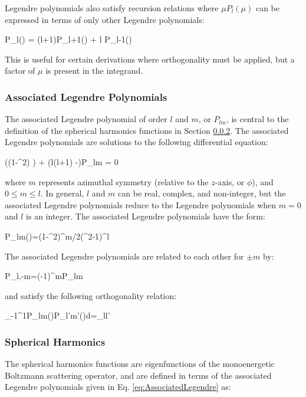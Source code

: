 Legendre polynomials also satisfy recursion relations where \(\mu P_l(\mu)\) can be expressed in terms of only other Legendre polynomials:

\beq
\label{eqn:LegendrePolynomialRecursion1}
\mu P_l(\mu) =  \left\lbrack(l+1)P_{l+1}(\mu) + l P_{l-1}(\mu)\right\rbrack
\eeq

This is useful for certain derivations where orthogonality must be applied, but a factor of \(\mu\) is present in the integrand.

\subsubsection{Associated Legendre Polynomials}

The associated Legendre polynomial of order \(l\) and \(m\), or \(P_{lm}\), is central to the definition of the spherical harmonics functions in Section \ref{sec:SH}. The associated Legendre polynomials are solutions to the following differential equation:

\beq
\label{eq:AssociatedLegendrePolynomialDiffEq}
 \left((1-\mu^2) \right) + \left(l(l+1) -\right)P_{lm} = 0
\eeq

where \(m\) represents azimuthal symmetry (relative to the \(z\)-axis, or \(\phi\)), and \(0\leq m\leq l\). In general, \(l\) and \(m\) can be real, complex, and non-integer, but the associated Legendre polynomials reduce to the Legendre polynomials when \(m=0\) and \(l\) is an integer. The associated Legendre polynomials have the form:

\beq
\label{eq:AssociatedLegendre}
P_{lm}(\mu)=(1-\mu^2)^{m/2}(\mu^2-1)^l
\eeq

The associated Legendre polynomials are related to each other for \(\pm m\) by:

\beq
\label{eq:relatingALP}
P_{l,-m}=(-1)^mP_{lm}
\eeq

and satisfy the following orthogonality relation:

\beq
\label{eq:AssociatedLegendreOthogonality}
\int_{-1}^{1}P_{lm}(\mu)P_{l'm'}(\mu)d\mu=\delta_{ll'}
\eeq

\subsubsection{Spherical Harmonics}
\label{sec:SH}

The spherical harmonics functions are eigenfunctions of the monoenergetic Boltzmann scattering operator, and are defined in terms of the associated Legendre polynomials given in Eq. \eqref{eq:AssociatedLegendre} as:

